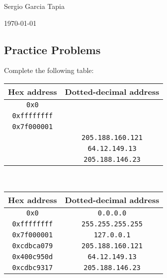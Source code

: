\documentclass[12pt]{article}
\newenvironment{ex}[2][Exercise]{\begin{trivlist}
		\item[\hskip \labelsep {\bfseries #1}\hskip \labelsep {\bfseries #2.}]}{\end{trivlist}}
\newenvironment{sol}[1][Solution]{\begin{trivlist}
		\item[\hskip \labelsep {\bfseries #1:}]}{\end{trivlist}}
\begin{document}

\noindent Sergio Garcia Tapia \hfill

 \hfill


\noindent\today

\subsection*{Practice Problems}

\begin{ex}{11.1}
	Complete the following table:
	\begin{center}
		\begin{tabular}{cc}
			Hex address & Dotted-decimal address \\
			\hline
			\texttt{0x0} & \makebox[1cm]{\hrulefill} \\
			\texttt{0xffffffff} & \makebox[1cm]{\hrulefill} \\
			\texttt{0x7f000001} & \makebox[1cm]{\hrulefill} \\
			\makebox[1cm]{\hrulefill} & \texttt{205.188.160.121}\\
			\makebox[1cm]{\hrulefill} & \texttt{64.12.149.13}\\
			\makebox[1cm]{\hrulefill} & \texttt{205.188.146.23}\\
		\end{tabular}
	\end{center}
\end{ex}

\begin{sol}
	\
	\begin{center}
		\begin{tabular}{cc}
			Hex address & Dotted-decimal address \\
			\hline
			\texttt{0x0} & \texttt{0.0.0.0} \\
			\texttt{0xffffffff} & \texttt{255.255.255.255} \\
			\texttt{0x7f000001} & \texttt{127.0.0.1} \\
			\texttt{0xcdbca079} & \texttt{205.188.160.121}\\
			\texttt{0x400c950d} & \texttt{64.12.149.13}\\
			\texttt{0xcdbc9317} & \texttt{205.188.146.23}\\
		\end{tabular}
	\end{center}
\end{sol}
\end{document}
